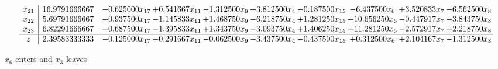 \documentclass[10pt]{article}
\begin{document}
\[\begin{array}{c| c c@{\hskip 2pt} c@{\hskip 2pt} c@{\hskip 2pt} c@{\hskip 2pt} c@{\hskip 2pt} c@{\hskip 2pt} c@{\hskip 2pt} c@{\hskip 2pt} }
 x_{21}   &  16.9791666667 & -0.625000 x_{17} & + 0.541667 x_{11} & -1.312500 x_{9} & + 3.812500 x_{4} & -0.187500 x_{15} & -6.437500 x_{6} & + 3.520833 x_{7} & -6.562500 x_{8}\\
 x_{22}   &  5.69791666667 & + 0.937500 x_{17} & -1.145833 x_{11} & + 1.468750 x_{9} & -6.218750 x_{4} & + 1.281250 x_{15} & + 10.656250 x_{6} & -0.447917 x_{7} & + 3.843750 x_{8}\\
 x_{23}   &  6.82291666667 & + 0.687500 x_{17} & -1.395833 x_{11} & + 1.343750 x_{9} & -3.093750 x_{4} & + 1.406250 x_{15} & + 11.281250 x_{6} & -2.572917 x_{7} & + 2.218750 x_{8}\\
\hline
z    &  2.39583333333 & -0.125000 x_{17} & -0.291667 x_{11} & -0.062500 x_{9} & -3.437500 x_{4} & -0.437500 x_{15} & + 0.312500 x_{6} & + 2.104167 x_{7} & -1.312500 x_{8}\\
\end{array}\]


 $ x_{6} $ enters and $ x_{3} $ leaves 
\end{document}
